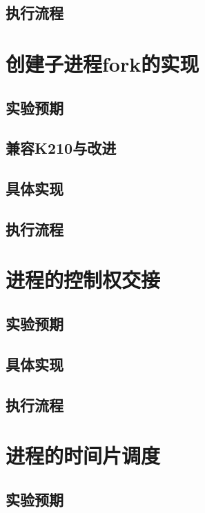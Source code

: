 \subsection{执行流程}

\section{创建子进程fork的实现}

\subsection{实验预期}

\subsection{兼容K210与改进}

\subsection{具体实现}

\subsection{执行流程}

\section{进程的控制权交接}

\subsection{实验预期}

\subsection{具体实现}

\subsection{执行流程}

\section{进程的时间片调度}

\subsection{实验预期}

